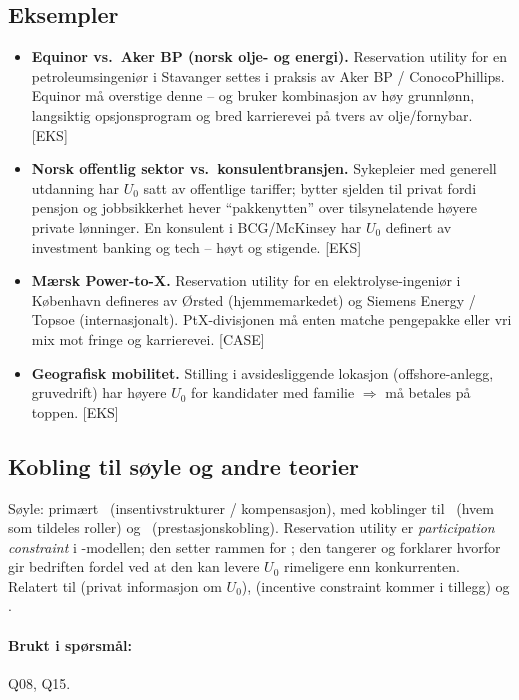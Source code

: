 \subsection*{Eksempler}
\begin{itemize}
\item \textbf{Equinor vs.\ Aker BP (norsk olje- og energi).} Reservation utility for en petroleumsingeniør i Stavanger settes i praksis av Aker BP / ConocoPhillips. Equinor må overstige denne -- og bruker kombinasjon av høy grunnlønn, langsiktig opsjonsprogram og bred karrierevei på tvers av olje/fornybar. [EKS]
\item \textbf{Norsk offentlig sektor vs.\ konsulentbransjen.} Sykepleier med generell utdanning har $U_0$ satt av offentlige tariffer; bytter sjelden til privat fordi pensjon og jobbsikkerhet hever ``pakkenytten'' over tilsynelatende høyere private lønninger. En konsulent i BCG/McKinsey har $U_0$ definert av investment banking og tech -- høyt og stigende. [EKS]
\item \textbf{Mærsk Power-to-X.} Reservation utility for en elektrolyse-ingeniør i København defineres av Ørsted (hjemmemarkedet) og Siemens Energy / Topsoe (internasjonalt). PtX-divisjonen må enten matche pengepakke eller vri mix mot fringe og karrierevei. [CASE]
\item \textbf{Geografisk mobilitet.} Stilling i avsidesliggende lokasjon (offshore-anlegg, gruvedrift) har høyere $U_0$ for kandidater med familie $\Rightarrow$  må betales på toppen. [EKS]
\end{itemize}

\subsection*{Kobling til søyle og andre teorier}
Søyle: primært \SThree\ (insentivstrukturer / kompensasjon), med koblinger til \SOne\ (hvem som tildeles roller) og \STwo\ (prestasjonskobling). Reservation utility er \emph{participation constraint} i -modellen; den setter rammen for ; den tangerer  og forklarer hvorfor  gir bedriften fordel ved at den kan levere $U_0$ rimeligere enn konkurrenten. Relatert til  (privat informasjon om $U_0$),  (incentive constraint kommer i tillegg) og .

\paragraph{Brukt i spørsmål:} Q08, Q15.
